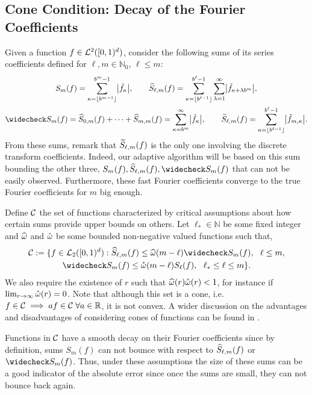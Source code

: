 \documentclass[graybox]{svmult}
\newcommand{\R}{\mathbb{R}} %
\newcommand{\N}{\mathbb{N}} %
\begin{document}
\subsection{Cone Condition: Decay of the Fourier Coefficients}\label{sumscoeff}
Given a function $f\in\mathcal{L}^2([0,1)^d)$, consider the following sums of its series coefficients defined for $\ell,m \in \N_0$, $\ell \le m$:
\begin{gather*}
S_m(f) =  \sum_{\kappa=\left \lfloor b^{m-1} \right \rfloor}^{b^{m}-1} \bigabs{\hf_{\kappa}}, \qquad 
\hS_{\ell,m}(f)  = \sum_{\kappa=\left \lfloor b^{\ell-1} \right \rfloor}^{b^{\ell}-1} \sum_{\lambda=1}^{\infty} \bigabs{ \hf_{\kappa+\lambda b^{m}}}, \\
\wcS_m(f)=\hS_{0,m}(f) + \cdots + \hS_{m,m}(f)=
\sum_{\kappa=b^{m}}^{\infty} \bigabs{\hf_{\kappa}}, \qquad
\tS_{\ell,m}(f) = \sum_{\kappa=\left \lfloor b^{\ell-1}\right \rfloor}^{b^{\ell}-1} \bigabs{\tf_{m,\kappa}}.
\end{gather*}
From these sums, remark that $\widetilde{S}_{\ell,m}(f)$ is the only one involving the discrete transform coefficients. Indeed, our adaptive algorithm will be based on this sum bounding the other three, $S_m(f),\hS_{\ell,m}(f),\wcS_m(f)$ that can not be easily observed. Furthermore, these fast Fourier coefficients converge to the true Fourier coefficients for $m$ big enough.

Define $\mathcal{C}$ the set of functions characterized by critical assumptions about how certain sums provide upper bounds on others.  Let $\ell_* \in \N$ be some fixed integer and $\widehat{\omega}$ and $\mathring{\omega}$ be some bounded non-negative valued functions such that,
\begin{multline} \label{conecond}
\cc:=\{f \in \cl_2(\cube) : \hS_{\ell,m}(f) \le \homega(m-\ell) \wcS_m(f),\ \ \ell \le m, \\
\wcS_m(f) \le \wcomega(m-\ell) S_{\ell}(f),\ \  \ell_* \le \ell \le m\}.
\end{multline}
We also require the existence of $r$ such that $\widehat{\omega}(r) \mathring{\omega}(r)<1$, for instance if $\lim_{r\rightarrow\infty}\mathring{\omega}(r)=0$. Note that although this set is a cone, i.e. $f \in \cc \implies af \in \cc\;\forall a\in\R$, it is not convex. A wider discussion on the advantages and disadvantages of considering cones of functions can be found in \cite{Clancy201421}.

Functions in $\mathcal{C}$ have a smooth decay on their Fourier coefficients since by definition, sums $S_m(f)$ can not bounce with respect to $\widehat{S}_{\ell,m}(f)$ or $\wcS_m(f)$. Thus, under these assumptions the size of these sums can be a good indicator of the absolute error since once the sums are small, they can not bounce back again.
\end{document}
